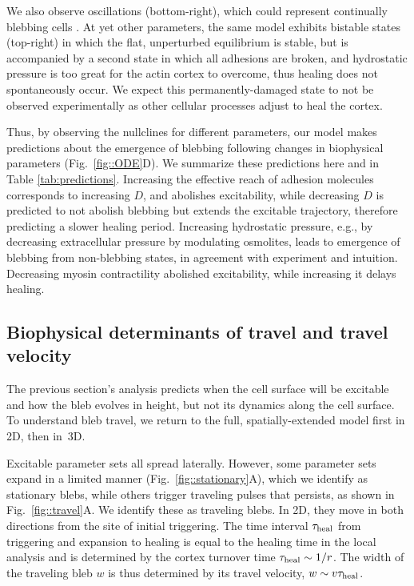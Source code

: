 We also observe oscillations (bottom-right), which could represent continually blebbing cells \cite{Charras:2008ic}. At yet other parameters, the same model exhibits bistable states (top-right) in which the flat, unperturbed equilibrium is stable, but is accompanied by a second state in which all adhesions are broken, and hydrostatic pressure is too great for the actin cortex to overcome, thus healing does not spontaneously occur. We expect this permanently-damaged state to not be observed experimentally as other cellular processes adjust to heal the cortex.  

Thus, by observing the nullclines  for different parameters, our model makes predictions about the emergence of blebbing following changes in biophysical parameters (Fig.~\ref{fig::ODE}D). We summarize these predictions here and in {Table \ref{tab:predictions}}. Increasing the effective reach of adhesion molecules corresponds to increasing $D$, and abolishes excitability, while decreasing $D$ is predicted to not abolish blebbing but extends the excitable trajectory, therefore predicting a slower healing period. Increasing hydrostatic pressure, e.g., by decreasing extracellular pressure by modulating osmolites, leads to emergence of blebbing from non-blebbing states, in agreement with experiment \cite{Tinevez:2009bh} and intuition. Decreasing myosin contractility abolished excitability, while increasing it delays healing. 


\subsection{Biophysical determinants of travel and travel velocity}

The previous section's analysis predicts when the cell surface will be excitable and how the bleb evolves in height, but not its dynamics along the cell surface. To understand bleb travel, we return to the full, spatially-extended model first in 2D, then in~3D. 

Excitable parameter sets all spread laterally. However, some parameter sets expand in a limited manner (Fig.~\ref{fig::stationary}A), which we identify as stationary blebs, while others trigger traveling pulses that persists, as shown in Fig.~\ref{fig::travel}A. We identify these as traveling blebs. In 2D, they move in both directions from the site of initial triggering. The time interval $\tau_{\mbox{\scriptsize heal}}$ from triggering and expansion to healing is equal to the healing time in the local analysis and is determined by the cortex turnover time $\tau_{\mbox{\scriptsize heal}} \sim 1/r$. The width of the traveling bleb $w$ is thus determined by its travel velocity, $w\sim v\tau_{\mbox{\scriptsize heal}}$. 

